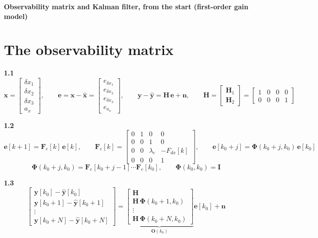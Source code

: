 \documentclass[11pt,a4paper]{ctexart}
\newcommand{\lc}{\lambda_c}
\begin{document}
\begin{center}\textbf{\large Observability matrix and Kalman filter, from the start (first-order gain model)}\end{center}

\section{The observability matrix}

\textbf{1.1}
\[
\mathbf{x} = \begin{bmatrix}\delta x_1\\ \delta x_2\\ \delta x_3\\ a_x\end{bmatrix}, \qquad
\mathbf{e} = \mathbf{x} - \hat{\mathbf{x}} = \begin{bmatrix} e_{\delta x_1}\\ e_{\delta x_2}\\ e_{\delta x_3}\\ e_{a_x}\end{bmatrix}, \qquad
\mathbf{y} - \hat{\mathbf{y}} = \mathbf{H}\,\mathbf{e} + \mathbf{n}, \qquad
\mathbf{H} = \begin{bmatrix} \mathbf{H}_1 \\ \mathbf{H}_2 \end{bmatrix} = \begin{bmatrix} 1 & 0 & 0 & 0 \\ 0 & 0 & 0 & 1 \end{bmatrix}
\]

\textbf{1.2}
\[
\mathbf{e}[k+1] = \mathbf{F}_e[k]\,\mathbf{e}[k], \qquad
\mathbf{F}_e[k] = \begin{bmatrix} 0 & 1 & 0 & 0 \\ 0 & 0 & 1 & 0 \\ 0 & 0 & \lc & -F_{dx}[k] \\ 0 & 0 & 0 & 1 \end{bmatrix}, \qquad
\mathbf{e}[k_0 + j] = \bm{\Phi}(k_0 + j, k_0)\,\mathbf{e}[k_0]
\]
\[
\bm{\Phi}(k_0 + j, k_0) = \mathbf{F}_e[k_0+j-1]\cdots\mathbf{F}_e[k_0], \qquad \bm{\Phi}(k_0, k_0) = \mathbf{I}
\]

\textbf{1.3}
\[
\begin{bmatrix} \mathbf{y}[k_0] - \hat{\mathbf{y}}[k_0] \\ \mathbf{y}[k_0+1] - \hat{\mathbf{y}}[k_0+1] \\ \vdots \\ \mathbf{y}[k_0+N] - \hat{\mathbf{y}}[k_0+N] \end{bmatrix}
=
\underbrace{\begin{bmatrix} \mathbf{H} \\ \mathbf{H}\,\bm{\Phi}(k_0+1,k_0) \\ \vdots \\ \mathbf{H}\,\bm{\Phi}(k_0+N,k_0) \end{bmatrix}}_{\mathbf{O}(k_0)}
\mathbf{e}[k_0] + \mathbf{n}
\]
\end{document}
